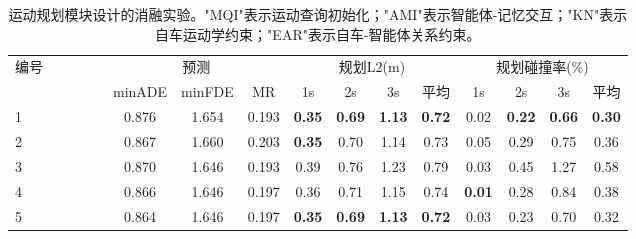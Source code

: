 \begin{table}[t]
	\caption{运动规划模块设计的消融实验。"MQI"表示运动查询初始化；"AMI"表示智能体-记忆交互；"KN"表示自车运动学约束；"EAR"表示自车-智能体关系约束。}
	\begin{center}
	\tiny
	\vspace{-10pt}
	\resizebox{0.9\textwidth}{!}
	{
	\begin{tabular}{l|cccc|ccc|cccc|cccc}
	\toprule
	\multirow{2}{*}{编号} &
	\multirow{2}{*}{\makecell{MQI}} &
	\multirow{2}{*}{\makecell{AMI}} &
	\multirow{2}{*}{\makecell{KN}} &
	\multirow{2}{*}{\makecell{EAR}} &

	\multicolumn{3}{c|}{预测} &
	\multicolumn{4}{c|}{规划L2(m)} &
	\multicolumn{4}{c|}{规划碰撞率(\%)} \\

	&&&& & minADE&	minFDE	&MR & 1s & 2s  & 3s&平均 & 1s & 2s  & 3s&平均\\
	\midrule
	1&\Checkmark&\Checkmark&\Checkmark&\Checkmark&0.876&	1.654&	0.193&	\textbf{0.35}&\textbf{0.69}&\textbf{\textbf{1.13}}&\textbf{0.72}&0.02& \textbf{0.22} & \textbf{\textbf{0.66}}&\textbf{0.30}\\
	2&&\Checkmark&\Checkmark&\Checkmark&0.867&	1.660&	0.203	&\textbf{0.35} & 0.70 & 1.14	& 0.73 & 0.05 & 0.29&0.75 & 0.36\\
	3&\Checkmark&&\Checkmark&\Checkmark& 0.870&1.646&	0.193	&0.39&0.76&1.23&0.79&	0.03&0.45&1.27&0.58\\
	4&\Checkmark&\Checkmark&&\Checkmark&0.866&	1.646&	0.197	&0.36&0.71&1.15&0.74&	\textbf{\textbf{0.01}}&0.28&0.84&0.38\\
	5&\Checkmark&\Checkmark&\Checkmark&&0.864&	1.646&0.197&	\textbf{0.35}&\textbf{0.69}&\textbf{1.13}&\textbf{0.72}	&0.03&0.23&0.70&0.32\\
	\bottomrule
	\end{tabular}%
	}
	\end{center}
	\label{tab:motionpalnner-ablations}
\end{table}